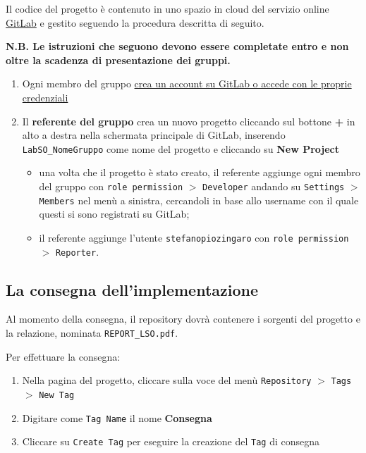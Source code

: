 \documentclass[
]{article}
\providecommand{\tightlist}{%
  \setlength{\itemsep}{0pt}\setlength{\parskip}{0pt}}
\begin{document}
Il codice del progetto è contenuto in uno spazio in cloud del servizio
online \href{http://gitlab.com}{GitLab} e gestito seguendo la procedura
descritta di seguito.

\textbf{N.B. Le istruzioni che seguono devono essere completate entro e
non oltre la scadenza di presentazione dei gruppi.}

\begin{enumerate}
\def\labelenumi{\arabic{enumi}.}
\tightlist
\item
  Ogni membro del gruppo \href{https://gitlab.com/users/sign_in}{crea un
  account su GitLab o accede con le proprie credenziali}
\item
  Il \textbf{referente del gruppo} crea un nuovo progetto cliccando sul
  bottone \textbf{+} in alto a destra nella schermata principale di
  GitLab, inserendo \texttt{LabSO\_NomeGruppo} come nome del progetto e
  cliccando su \textbf{New Project}

  \begin{itemize}
  \tightlist
  \item
    una volta che il progetto è stato creato, il referente aggiunge ogni
    membro del gruppo con \texttt{role\ permission} \(>\)
    \texttt{Developer} andando su \texttt{Settings} \(>\)
    \texttt{Members} nel menù a sinistra, cercandoli in base allo
    username con il quale questi si sono registrati su GitLab;
  \item
    il referente aggiunge l'utente \texttt{stefanopiozingaro} con
    \texttt{role\ permission} \(>\) \texttt{Reporter}.
  \end{itemize}
\end{enumerate}

\hypertarget{la-consegna-dellimplementazione}{%
\subsection{La consegna
dell'implementazione}\label{la-consegna-dellimplementazione}}

Al momento della consegna, il repository dovrà contenere i sorgenti del
progetto e la relazione, nominata \texttt{REPORT\_LSO.pdf}.

Per effettuare la consegna:

\begin{enumerate}
\def\labelenumi{\arabic{enumi}.}
\tightlist
\item
  Nella pagina del progetto, cliccare sulla voce del menù
  \texttt{Repository} \(>\) \texttt{Tags} \(>\) \texttt{New\ Tag}
\item
  Digitare come \texttt{Tag\ Name} il nome \textbf{Consegna}
\item
  Cliccare su \texttt{Create\ Tag} per eseguire la creazione del
  \texttt{Tag} di consegna
\end{enumerate}
\end{document}
